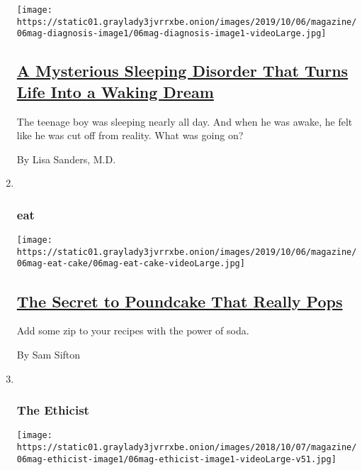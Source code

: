 \begin{enumerate}
  \texttt{[image: https://static01.graylady3jvrrxbe.onion/images/2019/10/06/magazine/06mag-diagnosis-image1/06mag-diagnosis-image1-videoLarge.jpg]}

  \hypertarget{a-mysterious-sleeping-disorder-that-turns-life-into-a-waking-dream}{%
  \subsection{\texorpdfstring{\href{/2019/10/02/magazine/mysterious-sleeping-disorder-diagnosis.html}{A
  Mysterious Sleeping Disorder That Turns Life Into a Waking
  Dream}}{A Mysterious Sleeping Disorder That Turns Life Into a Waking Dream}}\label{a-mysterious-sleeping-disorder-that-turns-life-into-a-waking-dream}}

  The teenage boy was sleeping nearly all day. And when he was awake, he
  felt like he was cut off from reality. What was going on?

  By Lisa Sanders, M.D.
\item ~
  \hypertarget{eat}{%
  \subsubsection{eat}\label{eat}}

  \texttt{[image: https://static01.graylady3jvrrxbe.onion/images/2019/10/06/magazine/06mag-eat-cake/06mag-eat-cake-videoLarge.jpg]}

  \hypertarget{the-secret-to-poundcake-that-really-pops}{%
  \subsection{\texorpdfstring{\href{/2019/10/02/magazine/poundcake-7-up-soda-recipe.html}{The
  Secret to Poundcake That Really
  Pops}}{The Secret to Poundcake That Really Pops}}\label{the-secret-to-poundcake-that-really-pops}}

  Add some zip to your recipes with the power of soda.

  By Sam Sifton
\item ~
  \hypertarget{the-ethicist}{%
  \subsubsection{The Ethicist}\label{the-ethicist}}

  \texttt{[image: https://static01.graylady3jvrrxbe.onion/images/2018/10/07/magazine/06mag-ethicist-image1/06mag-ethicist-image1-videoLarge-v51.jpg]}

  \hypertarget{i-owed-my-sibling-money-must-i-give-it-to-the-scamming-widowed-spouse}{%
}
\end{enumerate}
